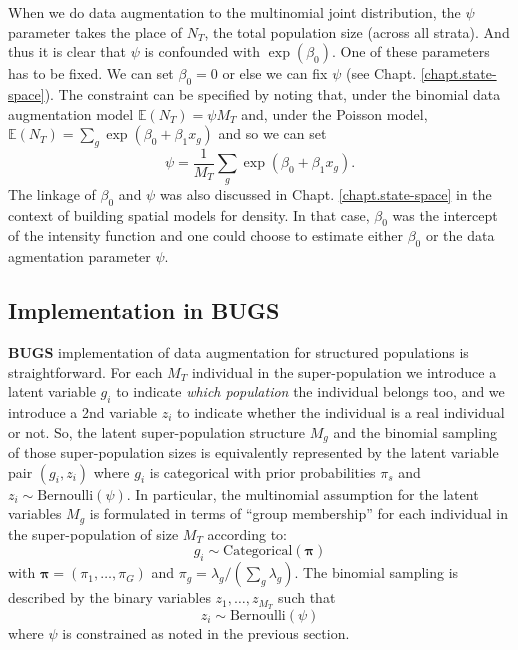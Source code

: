 When we do data augmentation to the multinomial joint distribution,
the $\psi$ parameter takes the place of $N_{T}$, the total population
size (across all strata). And thus it is clear that $\psi$ is
confounded with $\exp(\beta_{0})$. 
One of these parameters has to be fixed. We can set
$\beta_0 = 0$ or else we can fix $\psi$ (see Chapt. \ref{chapt.state-space}).  The constraint can be
specified by noting that, under the binomial data augmentation model
$\mathbb{E}(N_{T}) = \psi M_{T}$ and, under the Poisson model,
$\mathbb{E}(N_{T}) = \sum_{g} \exp(\beta_{0} + \beta_{1} x_{g})$ and
so we can set
\[
 \psi = \frac{1}{M_{T}} \sum_{g} \exp(\beta_{0} + \beta_{1} x_{g}).
\]
The linkage of $\beta_{0}$ and $\psi$ was also discussed in
Chapt. \ref{chapt.state-space} in the context of building spatial
models for density. In that case, $\beta_0$ was the intercept of the
intensity function and one could choose to estimate either $\beta_0$
or the data agmentation parameter $\psi$.

\subsection{Implementation in BUGS}

{\bf BUGS} implementation of data augmentation for structured
populations is straightforward. 
For each $M_{T}$ individual in the
super-population we introduce a latent variable $g_{i}$ to indicate
{\it which population} the individual belongs too, and we introduce a 2nd
variable $z_{i}$ to indicate whether the individual is a real
individual or not.  So, the latent super-population structure $M_{g}$
and the binomial sampling of those super-population sizes is
equivalently represented by the latent variable pair $(g_{i},z_{i})$
where $g_{i}$ is categorical with prior probabilities $\pi_{s}$ and
$z_{i} \sim \mbox{Bernoulli}(\psi)$.  In particular, the multinomial assumption
for the latent variables $M_{g}$ is formulated in terms of ``group
membership'' for each individual in the super-population of size $M_{T}$
according to:
\[
 g_{i} \sim \mbox{Categorical}\left( {\bm \pi} \right)
\]
with ${\bm \pi} = (\pi_{1}, \ldots, \pi_{G})$ and $\pi_{g} =
\lambda_{g}/(\sum_{g} \lambda_{g})$.  The binomial sampling is
described by the binary variables $z_{1},\ldots,z_{M_{T}}$ such that
\[
 z_{i} \sim \mbox{Bernoulli}(\psi)
\]
where $\psi$ is constrained as noted in the previous section.  

